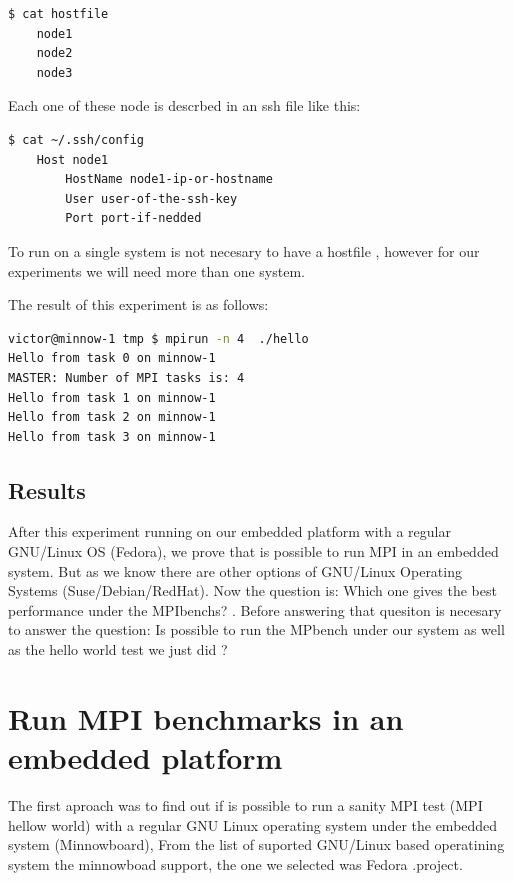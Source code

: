 \begin{lstlisting}[frame=single,language=bash]
  $ cat hostfile
    node1
    node2
    node3
\end{lstlisting}

Each one of these node is descrbed in an ssh file like this:

\begin{lstlisting}[frame=single,language=bash]
  $ cat ~/.ssh/config
    Host node1
        HostName node1-ip-or-hostname
        User user-of-the-ssh-key
        Port port-if-nedded
\end{lstlisting}

To run on a single system is not necesary to have a hostfile , however for our
experiments we will need more than one system.

The result of this experiment is as follows:

\begin{lstlisting}[frame=single,language=bash]
victor@minnow-1 tmp $ mpirun -n 4  ./hello
Hello from task 0 on minnow-1
MASTER: Number of MPI tasks is: 4
Hello from task 1 on minnow-1
Hello from task 2 on minnow-1
Hello from task 3 on minnow-1
\end{lstlisting}


\subsection{Results}

After this experiment running on our embedded platform with a regular GNU/Linux
OS (Fedora), we prove that is possible to run MPI in an embedded system. But as
we know there are other options of GNU/Linux Operating Systems
(Suse/Debian/RedHat). Now the question is: Which one gives the best
performance under the MPIbenchs? . Before answering that quesiton is necesary
to answer the question: Is possible to run the MPbench under our system as well
as the hello world test we just did ?


\section{Run MPI benchmarks in an embedded platform}

The first aproach was to find out if is possible to run a sanity MPI test (MPI
hellow world) with a regular GNU Linux operating system under the embedded
system (Minnowboard\cite{minnowboard}),  From the list of suported GNU/Linux
based operatining system the minnowboad support, the one we selected was Fedora
\cite{fedora}.project. 


